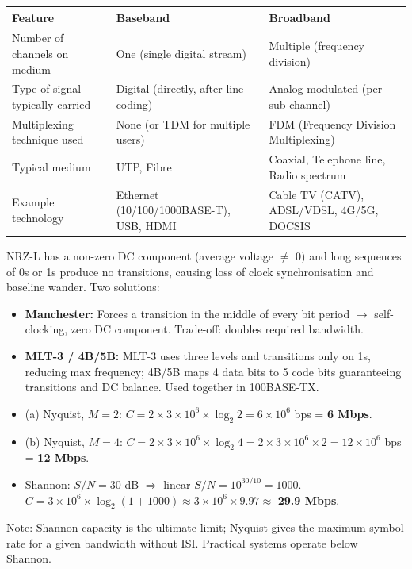 \documentclass[11pt]{article}
\begin{document}
\begin{corrige}
\begin{center}
\begin{tabularx}{\linewidth}{|l|X|X|}
\hline
\rowcolor{popblueL}
\textbf{Feature} & \textbf{Baseband} & \textbf{Broadband} \\
\hline
Number of channels on medium & One (single digital stream) & Multiple (frequency division) \\
\hline
Type of signal typically carried & Digital (directly, after line coding) & Analog-modulated (per sub-channel) \\
\hline
Multiplexing technique used & None (or TDM for multiple users) & FDM (Frequency Division Multiplexing) \\
\hline
Typical medium & UTP, Fibre & Coaxial, Telephone line, Radio spectrum \\
\hline
Example technology & Ethernet (10/100/1000BASE-T), USB, HDMI & Cable TV (CATV), ADSL/VDSL, 4G/5G, DOCSIS \\
\hline
\end{tabularx}
\end{center}
\end{corrige}

\begin{corrige}
NRZ-L has a non-zero DC component (average voltage $\neq$ 0) and long sequences of 0s or 1s produce no transitions, causing loss of clock synchronisation and baseline wander. Two solutions:
\begin{itemize}
    \item \textbf{Manchester:} Forces a transition in the middle of every bit period $\to$ self-clocking, zero DC component. Trade-off: doubles required bandwidth.
    \item \textbf{MLT-3 / 4B/5B:} MLT-3 uses three levels and transitions only on 1s, reducing max frequency; 4B/5B maps 4 data bits to 5 code bits guaranteeing transitions and DC balance. Used together in 100BASE-TX.
\end{itemize}
\end{corrige}

\begin{corrige}
\begin{itemize}
    \item (a) Nyquist, $M=2$: $C = 2 \times 3 \times 10^6 \times \log_2 2 = 6 \times 10^6$ bps = \textbf{6 Mbps}.
    \item (b) Nyquist, $M=4$: $C = 2 \times 3 \times 10^6 \times \log_2 4 = 2 \times 3 \times 10^6 \times 2 = 12 \times 10^6$ bps = \textbf{12 Mbps}.
    \item Shannon: $S/N = 30$ dB $\Rightarrow$ linear $S/N = 10^{30/10} = 1000$. $C = 3 \times 10^6 \times \log_2(1+1000) \approx 3 \times 10^6 \times 9.97 \approx$ \textbf{29.9 Mbps}.
\end{itemize}
Note: Shannon capacity is the ultimate limit; Nyquist gives the maximum symbol rate for a given bandwidth without ISI. Practical systems operate below Shannon.
\end{corrige}
\end{document}
